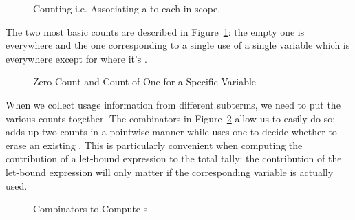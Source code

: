 \begin{figure}[h]
\begin{minipage}{0.45\textwidth}
\end{minipage}
\begin{minipage}{0.45\textwidth}
\end{minipage}
\caption{Counting i.e. Associating a  to each  in scope.}
\end{figure}

The two most basic counts are described in Figure~\ref{fig:basiccount}: the
empty one is  everywhere and the one corresponding to a single use
of a single variable  which is  everywhere except for 
where it's .

\begin{figure}[H]
\begin{minipage}{0.45\textwidth}
\end{minipage}
\begin{minipage}{0.45\textwidth}
\end{minipage}
\caption{Zero Count and Count of One for a Specific Variable}\label{fig:basiccount}
\end{figure}

When we collect usage information from different subterms, we need to put the
various counts together. The combinators in Figure~\ref{fig:combinatorscount}
allow us to easily do so:  adds up two counts in a pointwise manner
while  uses one  to decide whether to erase an existing
. This is particularly convenient when computing the contribution of
a let-bound expression to the total tally: the contribution of the let-bound
expression will only matter if the corresponding variable is actually used.

\begin{figure}[H]
\begin{minipage}{0.5\textwidth}
\end{minipage}
\begin{minipage}{0.4\textwidth}
\end{minipage}
\caption{Combinators to Compute s}\label{fig:combinatorscount}
\end{figure}

